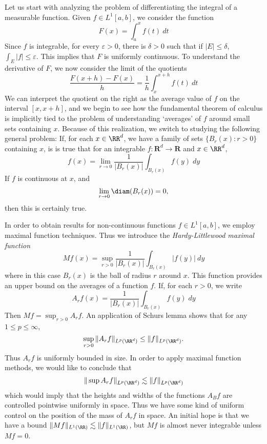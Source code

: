 Let us start with analyzing the problem of differentiating the integral of a measurable function. Given $f \in L^1[a,b]$, we consider the function
%
\[ F(x) = \int_a^x f(t)\ dt \]
%
Since $f$ is integrable, for every $\varepsilon > 0$, there is $\delta > 0$ such that if $|E| \leq \delta$, $\int_E |f| \leq \varepsilon$. This implies that $F$ is uniformly continuous. To understand the derivative of $F$, we now consider the limit of the quotients
%
\[ \frac{F(x+h) - F(x)}{h} = \frac{1}{h} \int_x^{x+h} f(t)\ dt \]
%
We can interpret the quotient on the right as the average value of $f$ on the interval $[x,x+h]$, and we begin to see how the fundamental theorem of calculus is implicitly tied to the problem of understanding `averages' of $f$ around small sets containing $x$. Because of this realization, we switch to studying the following general problem: If, for each $x \in \RR^d$, we have a family of sets $\{ B_r(x) : r > 0 \}$ containing $x$, is is true that for an integrable $f: \mathbf{R}^d \to \mathbf{R}$ and $x \in \RR^d$,
%
\[ f(x) = \lim_{r \to 0} \frac{1}{|B_r(x)|} \int_{B_r(x)} f(y)\; dy \]
%
If $f$ is continuous at $x$, and
%
\[ \lim_{r \to 0} \diam(B_r(x)) = 0, \]
%
then this is certainly true.

In order to obtain results for non-continuous functions $f \in L^1[a,b]$, we employ maximal function techniques. Thus we introduce the \emph{Hardy-Littlewood maximal function}
%
\[ Mf(x) = \sup_{r > 0} \frac{1}{|B_r(x)|} \int_{B_r(x)} |f(y)|\ dy \]
%
where in this case $B_r(x)$ is the ball of radius $r$ around $x$. This function provides an upper bound on the averages of a function $f$. If, for each $r > 0$, we write
%
\[ A_r f(x) = \frac{1}{|B_r(x)|} \int_{B_r(x)} f(y)\; dy \]
%
Then $Mf = \sup_{r > 0} A_r f$. An application of Schurs lemma shows that for any $1 \leq p \leq \infty$,
%
\[ \sup_{r > 0} \| A_r f \|_{L^p(\RR^d)} \leq \| f \|_{L^p(\RR^d)}. \]
%
Thus $A_r f$ is uniformly bounded in size. In order to apply maximal function methods, we would like to conclude that
%
\[ \| \sup A_r f \|_{L^p(\RR^d)} \lesssim \| f \|_{L^p(\RR^d)} \]
%
which would imply that the heights and widths of the functions $A_B f$ are controlled pointwise uniformly in space. Thus we have some kind of uniform control on the position of the mass of $A_r f$ in space. An initial hope is that we have a bound $\| Mf \|_{L^1(\RR)} \lesssim \| f \|_{L^1(\RR)}$, but $Mf$ is almost never integrable unless $Mf = 0$.

